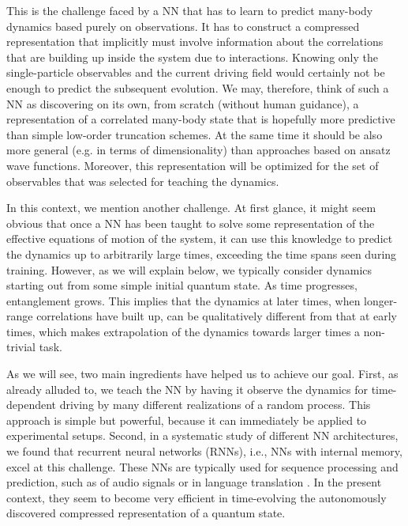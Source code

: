\documentclass[a4paper,aps,amsmath,amssymb,twocolumn,longbibliography,,accepted=2022-05-17]{quantumarticle}
\begin{document}
This is the challenge faced by a NN that has to learn to predict many-body dynamics based purely on observations. It has to construct a compressed representation that implicitly must involve information about the correlations that are building up inside the system due to interactions. Knowing only the single-particle observables and the current driving field would certainly not be enough to predict the subsequent evolution. We may, therefore, think of such a NN as discovering on its own, from scratch (without human guidance), a representation of a correlated many-body state that is hopefully more predictive than simple low-order truncation schemes. At the same time it should be also more general (e.g. in terms of dimensionality) than approaches based on ansatz wave functions. Moreover, this representation will be optimized for the set of observables that was selected for teaching the dynamics.


In this context, we mention another challenge. At first glance, it might seem obvious that once a NN has been taught to solve some representation of the effective equations of motion of the system, it can use this knowledge to predict the dynamics up to arbitrarily large times, exceeding the time spans seen during training. However, as we will explain below, we typically consider dynamics starting out from some simple initial quantum state. As time progresses, entanglement grows. This implies that the dynamics at later times, when longer-range correlations have built up, can be qualitatively different from that at early times, which makes extrapolation of the dynamics towards larger times a non-trivial task.

As we will see, two main ingredients have helped us to achieve our goal. First, as already alluded to, we teach the NN by having it observe the dynamics for time-dependent driving by many different realizations of a random process. This approach is simple but powerful, because it can immediately be applied to experimental setups. Second, in a systematic study of different NN architectures, we found that recurrent neural networks (RNNs), i.e., NNs with internal memory, excel at this challenge. These NNs are typically used for sequence processing and prediction, such as of audio signals \cite{graves2013speech} or in language translation \cite{sutskever2014sequence}. In the present context, they seem to become very efficient in time-evolving the autonomously discovered compressed representation of a quantum state.
\end{document}
